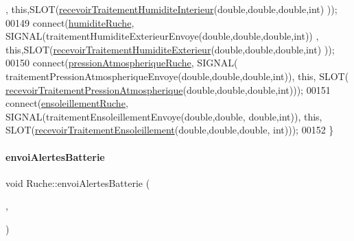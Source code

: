 \begin{DoxyCode}
      , \textcolor{keyword}{this},SLOT(\hyperlink{class_ruche_a6d4c59f2850f803a0ed1946e737b4262}{recevoirTraitementHumiditeInterieur}(\textcolor{keywordtype}{double},\textcolor{keywordtype}{double},\textcolor{keywordtype}{double},\textcolor{keywordtype}{int})
      ));
00149     connect(\hyperlink{class_ruche_acb380928928e693a1933c4cf607ddf80}{humiditeRuche}, SIGNAL(traitementHumiditeExterieurEnvoye(\textcolor{keywordtype}{double},\textcolor{keywordtype}{double},\textcolor{keywordtype}{double},\textcolor{keywordtype}{int}))
      , \textcolor{keyword}{this},SLOT(\hyperlink{class_ruche_a59e89246b484d7b63851c0ebd20af6c5}{recevoirTraitementHumiditeExterieur}(\textcolor{keywordtype}{double},\textcolor{keywordtype}{double},\textcolor{keywordtype}{double},\textcolor{keywordtype}{int})
      ));
00150     connect(\hyperlink{class_ruche_a06efa82900dc7e31ed67c826d3157ae0}{pressionAtmospheriqueRuche}, SIGNAL(
      traitementPressionAtmospheriqueEnvoye(\textcolor{keywordtype}{double},\textcolor{keywordtype}{double},\textcolor{keywordtype}{double},\textcolor{keywordtype}{int})), \textcolor{keyword}{this}, SLOT(
      \hyperlink{class_ruche_aa42daeffa023c83fde40072601e1fa39}{recevoirTraitementPressionAtmospherique}(\textcolor{keywordtype}{double},\textcolor{keywordtype}{double},\textcolor{keywordtype}{double},\textcolor{keywordtype}{int})));
00151     connect(\hyperlink{class_ruche_a197003ecff4f029885c7d38569a68d49}{ensoleillementRuche}, SIGNAL(traitementEnsoleillementEnvoye(\textcolor{keywordtype}{double},\textcolor{keywordtype}{double},\textcolor{keywordtype}{
      double},\textcolor{keywordtype}{int})), \textcolor{keyword}{this}, SLOT(\hyperlink{class_ruche_a2ac5766ce8652084f034c498691488ea}{recevoirTraitementEnsoleillement}(\textcolor{keywordtype}{double},\textcolor{keywordtype}{double},\textcolor{keywordtype}{double},\textcolor{keywordtype}{
      int})));
00152 \}
\end{DoxyCode}
\mbox{\label{class_ruche_ac76ce5692e134b365330d91af2a6b4e7}} 
\paragraph{\texorpdfstring{envoi\+Alertes\+Batterie}{envoiAlertesBatterie}}
{\footnotesize\ttfamily void Ruche\+::envoi\+Alertes\+Batterie (\begin{DoxyParamCaption}\item[{\hyperlink{parametres_8h_aaa6de8207c94675264c90b10b613368d}{Seuils\+Alertes}}]{,  }\item[{double}]{ }\end{DoxyParamCaption})\hspace{0.3cm}{\ttfamily [signal]}}




